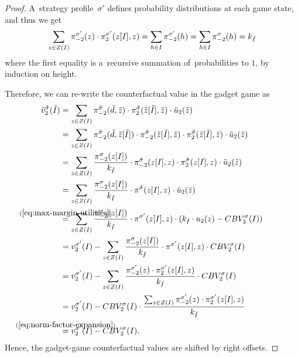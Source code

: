 \begin{proof}
  A~strategy profile~$\sigma'$ defines probability distributions at each game state, and thus we get
  \begin{equation}
    \label{eq:norm-factor-expansion}
    \sum_{z\in Z(I)} \pi_{-2}^{\sigma'}(z) \cdot \pi_{2}^{\sigma'}(z[I], z)
    = \sum_{ h \in I} \pi_{-2}^{\sigma'}(h)
    = \sum_{ h \in I} \pi_{-2}^\sigma(h)
    = k_{\tilde{I}}
  \end{equation}
  where the first equality is a~recursive summation of~probabilities to $1$, by induction on height.

  Therefore, we can re-write the counterfactual value in the gadget game as
  \begin{equation*}
    \begin{split}
      \tilde{v}_2^\tilsig (\It)
      &= \sum_{z\in Z(I)}
      \pi_{-2}^\tilsig(\dt, \zt) 
      \cdot \pi_{2}^\tilsig(\zt[\It], \zt)
      \cdot \tilde{u}_2(\zt)
      \\
      &= \sum_{z\in Z(I)}
      \pi_{-2}^\tilsig(\dt, \zt[\It]) \cdot \pi_{-2}^\tilsig(\zt[\It], \zt) 
      \cdot \pi_{2}^\tilsig(\zt[\It], \zt)
      \cdot \tilde{u}_2(\zt)
      \\
      &= \sum_{z\in Z(I)}
      \frac{\pi_{-2}^{\sigma}(z[I])}{k_{\It}}
      \cdot \pi_{-2}^{\tilde{\sigma}}(z[I], z)
      \cdot \pi_{2}^{\tilde{\sigma}}(z[I], z)
      \cdot \tilde{u}_2(\zt)
      \\
      &= \sum_{z\in Z(I)}
      \frac{\pi_{-2}^{\sigma}(z[I])}{k_{\It}}
      \cdot \pi^{\tilde{\sigma}}(z[I], z)
      \cdot \tilde{u}_2(\zt)
      \\
      &\stackrel{\mathclap{\mathrm{(\ref{eq:max-margin-utilities})}}} =
      \sum_{z\in Z(I)}
      \frac{\pi_{-2}^{\sigma}(z[I])}{k_{\It}}
      \cdot \pi^{\sigma'}(z[I], z)
      \cdot (k_{\It} \cdot u_2(z) - CBV_2^\sigma(I))
      \\
      &= v_2 ^{\sigma'}(I) - \sum_{z\in Z(I)}
      \frac{\pi_{-2}^{\sigma}(z[I])}{k_{\It}}
      \cdot \pi^{\sigma'}(z[I], z)
      \cdot CBV_2^\sigma(I)
      \\
      &= v_2^{\sigma'}(I) - \sum_{z\in Z(I)}
      \frac {\pi_{-2}^{\sigma'}(z) \cdot \pi_{2}^{\sigma'}(z[I], z)} {k_{\It}}
      \cdot CBV_2^\sigma(I)
      \\
      &= v_2^{\sigma'}(I)
      - CBV_2^\sigma(I) \cdot 
      \frac {\sum_{z\in Z(I)} \pi_{-2}^{\sigma'}(z) \cdot \pi_{2}^{\sigma'}(z[I], z)} {k_{\It}}
      \\
      &\stackrel{\mathclap{\mathrm{(\ref{eq:norm-factor-expansion})}}} =
      v_2 ^{\sigma'}(I) - CBV_2^\sigma(I).
    \end{split}
  \end{equation*}
  Hence, the gadget-game counterfactual values are shifted by right offsets.
\end{proof}

